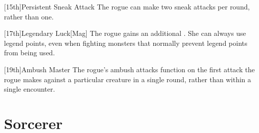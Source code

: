         [15th]{Persistent Sneak Attack}
        The rogue can make two sneak attacks per round, rather than one.

        [17th]{Legendary Luck}[Mag]
        The rogue gains an additional .
        She can always use legend points, even when fighting monsters that normally prevent legend points from being used.

        [19th]{Ambush Master}
        The rogue's ambush attacks function on the first attack the rogue makes against a particular creature in a single round, rather than within a single encounter.

\section{Sorcerer}\label{Sorcerer}
